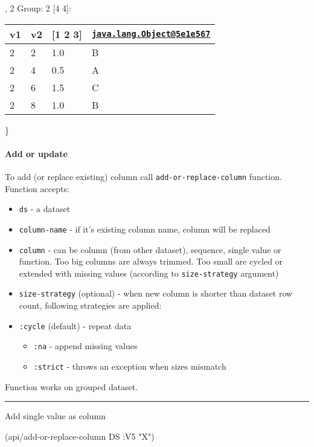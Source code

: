 \documentclass[]{article}
\newenvironment{Shaded}{\begin{snugshade}}{\end{snugshade}}
\newcommand{\AttributeTok}[1]{\textcolor[rgb]{0.77,0.63,0.00}{#1}}
\newcommand{\NormalTok}[1]{#1}
\newcommand{\StringTok}[1]{\textcolor[rgb]{0.31,0.60,0.02}{#1}}
\providecommand{\tightlist}{%
  \setlength{\itemsep}{0pt}\setlength{\parskip}{0pt}}
\let\oldparagraph\paragraph
\renewcommand{\paragraph}[1]{\oldparagraph{#1}\mbox{}}
\begin{document}
, 2 Group: 2 {[}4 4{]}:

\begin{longtable}[]{@{}llll@{}}
\toprule
v1 & v2 & {[}1 2 3{]} &
\href{mailto:java.lang.Object@5e1e567}{\nolinkurl{java.lang.Object@5e1e567}}\tabularnewline
\midrule
\endhead
2 & 2 & 1.0 & B\tabularnewline
2 & 4 & 0.5 & A\tabularnewline
2 & 6 & 1.5 & C\tabularnewline
2 & 8 & 1.0 & B\tabularnewline
\bottomrule
\end{longtable}

\}

\hypertarget{add-or-update}{%
\paragraph{Add or update}\label{add-or-update}}

To add (or replace existing) column call \texttt{add-or-replace-column}
function. Function accepts:

\begin{itemize}
\tightlist
\item
  \texttt{ds} - a dataset
\item
  \texttt{column-name} - if it's existing column name, column will be
  replaced
\item
  \texttt{column} - can be column (from other dataset), sequence, single
  value or function. Too big columns are always trimmed. Too small are
  cycled or extended with missing values (according to
  \texttt{size-strategy} argument)
\item
  \texttt{size-strategy} (optional) - when new column is shorter than
  dataset row count, following strategies are applied:
\item
  \texttt{:cycle} (default) - repeat data

  \begin{itemize}
  \tightlist
  \item
    \texttt{:na} - append missing values
  \item
    \texttt{:strict} - throws an exception when sizes mismatch
  \end{itemize}
\end{itemize}

Function works on grouped dataset.

\begin{center}\rule{0.5\linewidth}{0.5pt}\end{center}

Add single value as column

\begin{Shaded}
\begin{Highlighting}[]
\NormalTok{(api/add-or-replace-column DS }\AttributeTok{:V5} \StringTok{"X"}\NormalTok{)}
\end{Highlighting}
\end{Shaded}
\end{document}
